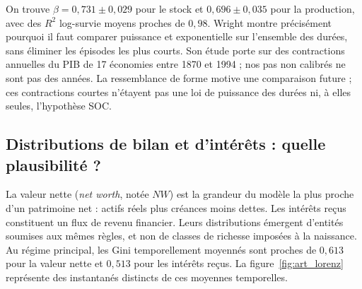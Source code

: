 
On trouve $\beta=0{,}731\pm0{,}029$ pour le stock et
$0{,}696\pm0{,}035$ pour la production, avec des $R^2$ log-survie moyens
proches de $0{,}98$. Wright \cite{wright} montre précisément pourquoi il
faut comparer puissance et exponentielle sur l'ensemble des durées, sans
éliminer les épisodes les plus courts. Son étude porte sur des contractions
annuelles du PIB de 17 économies entre 1870 et 1994 ; nos pas non calibrés
ne sont pas des années. La ressemblance de forme motive une comparaison
future ; ces contractions courtes n'étayent pas une loi de puissance des
durées ni, à elles seules, l'hypothèse SOC.

\subsection{Distributions de bilan et d'intérêts : quelle plausibilité ?}
La valeur nette (\emph{net worth}, notée $NW$) est la grandeur du modèle
la plus proche d'un patrimoine net : actifs réels plus créances moins
dettes. Les intérêts reçus constituent
un flux de revenu financier. Leurs distributions émergent d'entités soumises
aux mêmes règles, et non de classes de richesse imposées à la naissance.
Au régime principal, les Gini temporellement moyennés sont proches de
$0{,}613$ pour la valeur nette et $0{,}513$ pour les intérêts reçus.
La figure~\ref{fig:art_lorenz} représente des instantanés distincts de ces
moyennes temporelles.



